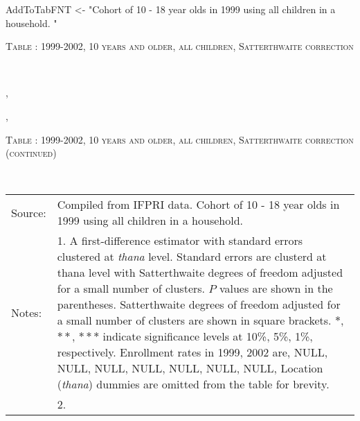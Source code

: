 \begin{Schunk}
\begin{Sinput}
AddToTabFNT <- "Cohort of 10 - 18 year olds in 1999 using all children in a household. " 
\end{Sinput}
\end{Schunk}
\begin{table}\hfil\textsc{\footnotesize Table \thetable: 1999-2002, 10 years and older, all children, Satterthwaite correction\label{zEm.1999.10.sameN}}\\\setlength{\tabcolsep}{1pt}\renewcommand{\arraystretch}{.675}\hspace{-2em}\hfil{}\\\renewcommand{\arraystretch}{1}\end{table}, \addtocounter{table}{-1}, \begin{table}\hfil\textsc{\footnotesize Table \thetable: 1999-2002, 10 years and older, all children, Satterthwaite correction (continued)\label{zEm.1999.10.sameN}}\\\setlength{\tabcolsep}{1pt}\renewcommand{\arraystretch}{.675}\hspace{-2em}\hfil{}\\\renewcommand{\arraystretch}{1}\hfil\begin{tabular}{>{\hfill\scriptsize}p{1cm}<{}>{\scriptsize}p{12cm}<{\hfill}} Source:& Compiled from IFPRI data. Cohort of 10 - 18 year olds in 1999 using all children in a household. \\[-1ex] Notes:& 1. A first-difference estimator with standard errors clustered at \textit{thana} level. Standard errors are clusterd at thana level with Satterthwaite degrees of freedom adjusted for a small number of clusters. $P$ values are shown in the parentheses. Satterthwaite degrees of freedom adjusted for a small number of clusters are shown in square brackets. $*$, $**$, $***$ indicate significance levels at 10\%, 5\%, 1\%, respectively. Enrollment rates in 1999, 2002 are, NULL, NULL, NULL, NULL, NULL, NULL, NULL, Location (\textit{thana}) dummies are omitted from the table for brevity. \\ & 2.   \end{tabular} \end{table}
